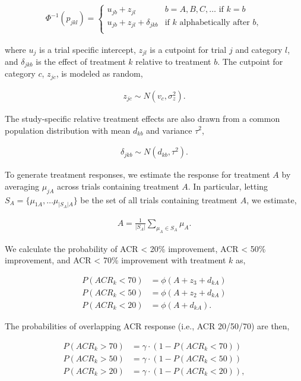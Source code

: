 \documentclass[11pt,final,fleqn]{article}\usepackage[]{graphicx}\usepackage[]{color}
\theoremstyle{plain}
\begin{document}
\begin{appendices}
\begin{align}
\Phi^{-1}(p_{jkl}) =
 \begin{cases}
     u_{jb} + z_{jl} & b=A,B,C,\ldots \text{ if } k = b \\
     u_{jb} + z_{jl} + \delta_{jkb} & \text{if $k$ alphabetically after } b, \\
  \end{cases}
\end{align}

where $u_j$ is a trial specific intercept, $z_{jl}$ is a cutpoint for trial $j$ and category $l$, and $\delta_{jkb}$ is the effect of treatment $k$ relative to treatment $b$. The cutpoint for category $c$, $z_{jc}$, is modeled as random,

\begin{align}
z_{jc} \sim N(v_c, \sigma^2_z).
\end{align}

The study-specific relative treatment effects are also drawn from a common population distribution with mean $d_{kb}$ and variance $\tau^2$,

\begin{align}
\delta_{jkb} \sim N(d_{kb}, \tau^2).
\end{align}

To generate treatment responses, we estimate the response for treatment $A$ by averaging $\mu_{jA}$ across trials containing treatment $A$. In particular, letting $S_A = \{\mu_{1A}, \ldots \mu_{|S_A|A}\}$ be the set of all trials containing treatment $A$, we estimate,

\begin{align} \label{eqn:NMA-A}
A = \frac{1}{|S_A|}\sum_{\mu_{A} \in S_A} \mu_{A}.
\end{align}

We calculate the probability of ACR < 20\% improvement, ACR < 50\% improvement, and ACR < 70\% improvement with treatment $k$ as,

\begin{align}
P(ACR_k < 70) &= \phi(A + z_3 + d_{kA}) \\
P(ACR_k < 50) &= \phi(A + z_2 + d_{kA}) \\
P(ACR_k < 20) &= \phi(A + d_{kA}).
\end{align}

The probabilities of overlapping ACR response (i.e., ACR 20/50/70) are then,

\begin{align} \label{eqn:ACR-overlap}
P(ACR_k > 70) &= \gamma \cdot (1 - P(ACR_k < 70))\\
P(ACR_k > 50) &= \gamma \cdot  (1 - P(ACR_k < 50)) \\
P(ACR_k > 20) &= \gamma \cdot (1 - P(ACR_k < 20)),
\end{align}


\end{appendices}
\end{document}

